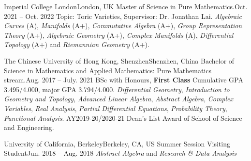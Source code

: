 \HeadingItemListStart
	\HeadingItem
		{Imperial College London}{London, UK}
		{Master of Science in Pure Mathematics.}{Oct. 2021 -- Oct. 2022}
		\ItemListStart
				{Topic: Toric Varieties, Supervisor: Dr. Jonathan Lai.}{}
				{\textit{Algebraic Curves} (A),
				\textit{Manifolds} (A+),
				\textit{Commutative Algebra} (A+),
				\textit{Group Representation Theory} (A+),
				\textit{Algebraic Geometry} (A+),
				\textit{Complex Manifolds} (A),
				\textit{Differential Topology} (A+)
				and \textit{Riemannian Geometry} (A+).}
		\ItemListEnd

	\HeadingItem
		{The Chinese University of Hong Kong, Shenzhen}{Shenzhen, China}
		{Bachelor of Science in Mathematics and Applied Mathematics: Pure Mathematics stream.}{Aug. 2017 -- July. 2021}
		\ItemListStart
				{BSc with Honours, \textbf{First Class}}
				{Cumulative GPA 3.495/4.000, major GPA 3.794/4.000.}
				{\textit{Differential Geometry}, \textit{Introduction to Geometry and Topology}, \textit{Advanced Linear Algebra}, \textit{Abstract Algebra}, \textit{Complex Variables}, \textit{Real Analysis}, \textit{Partial Differential Equations}, \textit{Probability Theory}, \textit{Functional Analysis}.}
				{AY2019-20/2020-21 Dean's List Award of School of Science and Engineering.}
		\ItemListEnd

	\HeadingItem
		{University of California, Berkeley}{Berkeley, CA, US}
		{Summer Session Visiting Student}{Jun. 2018 -- Aug. 2018}
		\ItemListStart
				{\textit{Abstract Algebra} and \textit{Research \& Data Analysis}}
		\ItemListEnd
		
\HeadingItemListEnd